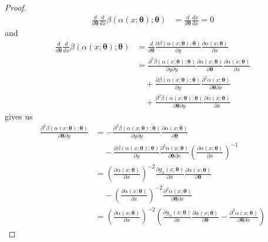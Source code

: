 \begin{proof}
\begin{align}
        \frac{d }{d \bm \theta} \frac{d }{d x} \beta(\alpha(x; \bm \theta); \bm \theta)  &= \frac{d }{d \bm \theta} \frac{d x}{d x} = 0
    \end{align}
    and
    \begin{align}
        \frac{d }{d \bm \theta} \frac{d }{d x} \beta(\alpha(x; \bm \theta); \bm \theta) 
        &= \frac{d}{d\bm \theta} \frac{\partial \beta(\alpha(x; \bm \theta); \bm \theta)}{\partial y} \frac{\partial \alpha(x; \bm \theta)}{\partial x} \\
        &= \frac{\partial^{2} \beta(\alpha(x; \bm \theta); \bm \theta)}{\partial y\partial y} \frac{\partial \alpha(x; \bm \theta)}{\partial \bm \theta} \frac{\partial \alpha(x; \bm \theta)}{\partial x}  \\
        &\quad + \frac{\partial \beta(\alpha(x; \bm \theta); \bm \theta)}{\partial y} \frac{\partial^{2} \alpha(x; \bm \theta)}{\partial \bm \theta \partial x} \nonumber  \\
        &\quad + \frac{\partial^{2} \beta(\alpha(x; \bm \theta); \bm \theta)}{\partial \bm \theta  \partial y} \frac{\partial \alpha(x; \bm \theta)}{\partial x} \nonumber 
    \end{align}
    gives us
    \begin{align}
        \frac{\partial^{2}\beta(\alpha(x; \bm \theta); \bm \theta)}{\partial \bm \theta \partial y}
        &= - \frac{\partial^{2} \beta(\alpha(x; \bm \theta); \bm \theta)}{\partial y\partial y} \frac{\partial \alpha(x; \bm \theta)}{\partial \bm \theta} \\
        &\quad - \frac{\partial \beta(\alpha(x; \bm \theta); \bm \theta)}{\partial y} \frac{\partial^{2} \alpha(x; \bm \theta)}{\partial \bm \theta \partial x} \left(\frac{\partial \alpha(x; \bm \theta)}{\partial x}\right)^{-1} \nonumber \\
        &= \left(\frac{\partial \alpha(x; \bm \theta)}{\partial x} \right)^{-2} \frac{\partial g_{\alpha}(x; \bm \theta)}{\partial x} \frac{\partial \alpha(x; \bm \theta)}{\partial \bm \theta} \\
        &\quad - \left(\frac{\partial \alpha(x; \bm \theta)}{\partial x} \right)^{-2} \frac{\partial^{2} \alpha(x; \bm \theta)}{\partial \bm \theta \partial x}  \nonumber\\
        &= \left(\frac{\partial \alpha(x; \bm \theta)}{\partial x} \right)^{-2} \left(\frac{\partial g_{\alpha}(x; \bm \theta)}{\partial x} \frac{\partial \alpha(x; \bm \theta)}{\partial \bm \theta}  - \frac{\partial^{2} \alpha(x; \bm \theta)}{\partial \bm \theta \partial x} \right)

\end{align}
\end{proof}
